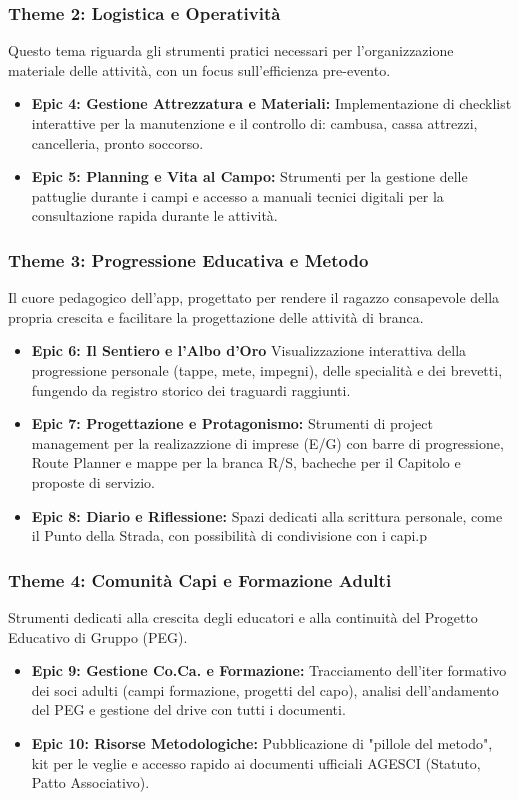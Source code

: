 \documentclass[11pt]{article}
\begin{document}
\subsubsection{Theme 2: Logistica e Operatività}
Questo tema riguarda gli strumenti pratici necessari per l'organizzazione materiale delle attività, con un focus sull'efficienza pre-evento.
\begin{itemize}
  \item \textbf{Epic 4: Gestione Attrezzatura e Materiali:} Implementazione di checklist interattive per la manutenzione e il controllo di: cambusa, cassa attrezzi, cancelleria, pronto soccorso.
  \item \textbf{Epic 5: Planning e Vita al Campo:} Strumenti per la gestione delle pattuglie durante i campi e accesso a manuali tecnici digitali per la consultazione rapida durante le attività.
\end{itemize}

\subsubsection{Theme 3: Progressione Educativa e Metodo}
Il cuore pedagogico dell'app, progettato per rendere il ragazzo consapevole della propria crescita e facilitare la progettazione delle attività di branca.
\begin{itemize}
  \item \textbf{Epic 6: Il Sentiero e l'Albo d'Oro}
  Visualizzazione interattiva della progressione personale (tappe, mete, impegni), delle specialità e dei brevetti, fungendo da registro storico dei traguardi raggiunti.
  \item \textbf{Epic 7: Progettazione e Protagonismo:} Strumenti di project management per la realizazzione di imprese (E/G) con barre di progressione, Route Planner e mappe per la branca R/S, bacheche per il Capitolo e proposte di servizio.
  \item \textbf{Epic 8: Diario e Riflessione:} Spazi dedicati alla scrittura personale, come il Punto della Strada, con possibilità di condivisione con i capi.p
\end{itemize}

\subsubsection{Theme 4: Comunità Capi e Formazione Adulti}
Strumenti dedicati alla crescita degli educatori e alla continuità del Progetto Educativo di Gruppo (PEG).
\begin{itemize}
  \item \textbf{Epic 9: Gestione Co.Ca. e Formazione:} Tracciamento dell'iter formativo dei soci adulti (campi formazione, progetti del capo), analisi dell'andamento del PEG e gestione del drive con tutti i documenti.
  \item \textbf{Epic 10: Risorse Metodologiche:} Pubblicazione di "pillole del metodo", kit per le veglie e accesso rapido ai documenti ufficiali AGESCI (Statuto, Patto Associativo).
\end{itemize}
\end{document}
